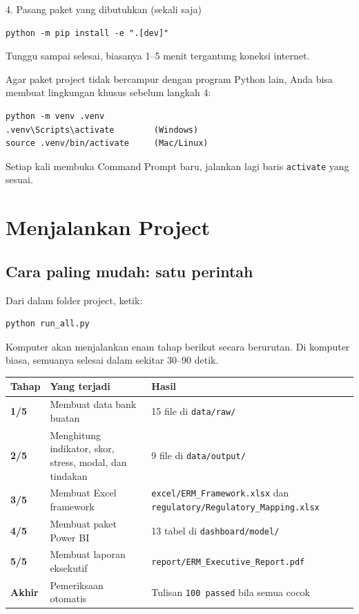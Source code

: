 \documentclass[11pt,a4paper]{article}
\newcommand{\file}[1]{\texttt{\small #1}}
\begin{document}
\begin{stepbox}{4. Pasang paket yang dibutuhkan (sekali saja)}
\begin{lstlisting}
python -m pip install -e ".[dev]"
\end{lstlisting}
Tunggu sampai selesai, biasanya 1--5 menit tergantung koneksi internet.
\end{stepbox}

\begin{tipbox}
Agar paket project tidak bercampur dengan program Python lain, Anda bisa membuat lingkungan khusus sebelum langkah 4:
\begin{lstlisting}
python -m venv .venv
.venv\Scripts\activate        (Windows)
source .venv/bin/activate     (Mac/Linux)
\end{lstlisting}
Setiap kali membuka Command Prompt baru, jalankan lagi baris \texttt{activate} yang sesuai.
\end{tipbox}
\section{Menjalankan Project}\label{sec:jalankan}

\subsection{Cara paling mudah: satu perintah}

Dari dalam folder project, ketik:
\begin{lstlisting}
python run_all.py
\end{lstlisting}

Komputer akan menjalankan enam tahap berikut secara berurutan. Di komputer biasa, semuanya selesai dalam sekitar 30--90 detik.

\begin{center}
\begin{tabularx}{\linewidth}{>{\bfseries}p{1.1cm}>{\raggedright\arraybackslash}p{4.4cm}X}
\toprule
Tahap & Yang terjadi & Hasil \\
\midrule
1/5 & Membuat data bank buatan & 15 file di \file{data/raw/} \\
2/5 & Menghitung indikator, skor, stress, modal, dan tindakan & 9 file di \file{data/output/} \\
3/5 & Membuat Excel framework & \file{excel/ERM\_\allowbreak{}Framework.xlsx} dan \file{regulatory/Regulatory\_\allowbreak{}Mapping.xlsx} \\
4/5 & Membuat paket Power BI & 13 tabel di \file{dashboard/model/} \\
5/5 & Membuat laporan eksekutif & \file{report/ERM\_\allowbreak{}Executive\_\allowbreak{}Report.pdf} \\
Akhir & Pemeriksaan otomatis & Tulisan \texttt{100 passed} bila semua cocok \\
\bottomrule
\end{tabularx}
\end{center}
\end{document}
